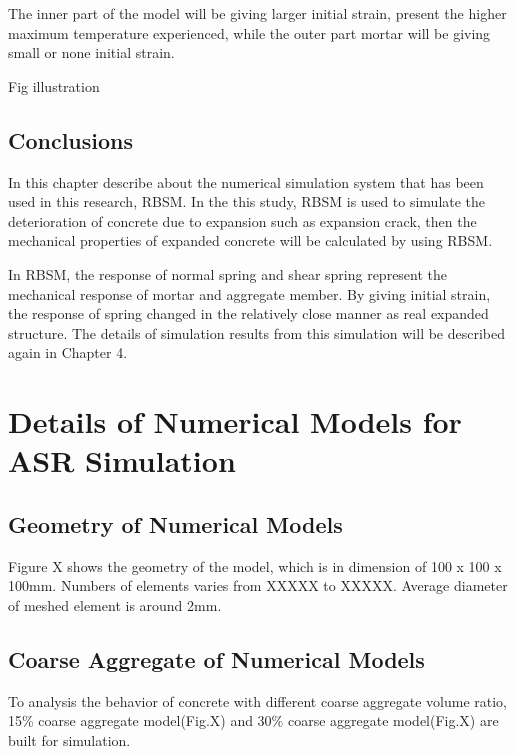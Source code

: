 The inner part of the model will be giving larger initial strain,  present the higher maximum temperature experienced, while the outer part mortar will be giving small or none initial strain.

Fig illustration


\subsection{Conclusions}

In this chapter describe about the numerical simulation system that has been used in this research, RBSM. In the this study, RBSM is used to simulate the deterioration of concrete due to expansion such as expansion crack, then the mechanical properties of expanded concrete will be calculated by using RBSM.

In RBSM, the response of normal spring and shear spring represent the mechanical response of mortar and aggregate member. By giving initial strain, the response of spring changed in the relatively close manner as real expanded structure. The details of simulation results from this simulation will be described again in Chapter 4.




\section{Details of Numerical Models for ASR Simulation}

\subsection{Geometry of Numerical Models}

Figure X shows the geometry of the model, which is in dimension of 100 x 100 x 100mm. Numbers of elements varies from XXXXX to XXXXX. Average diameter of meshed element is around 2mm.

\subsection{Coarse Aggregate of Numerical Models}

To analysis the behavior of concrete with different coarse aggregate volume ratio, 15\% coarse aggregate model(Fig.X) and 30\% coarse aggregate model(Fig.X) are built for simulation.

